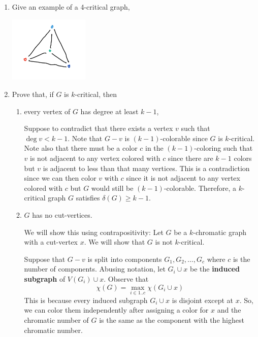 \begin{enumerate}[label=(\roman*)]
    \item Give an example of a 4-critical graph,
      \begin{solution}
        \centering
        \includegraphics[width=0.3\textwidth]{figures/4-critical}
      \end{solution}

    \item Prove that, if \(G\) is \(k\)-critical, then
      \begin{enumerate}[label=(\alph*)]
        \item every vertex of \(G\) has degree at least \(k-1\),
          \begin{solution}
            Suppose to contradict that there exists a vertex
            \(v\) such that \(\deg v < k-1\). Note that \(G-v\)
            is \((k-1)\)-colorable since \(G\) is \(k\)-critical.
            Note also that there must be a color \(c\) in the
            \((k-1)\)-coloring such that \(v\) is not adjacent to
            any vertex colored with \(c\) since there are \(k-1\)
            colors but \(v\) is adjacent to less than that many
            vertices. This is a contradiction since we can then
            color \(v\) with \(c\) since it is not adjacent to
            any vertex colored with \(c\) but \(G\) would still
            be \((k-1)\)-colorable. Therefore, a \(k\)-critical
            graph \(G\) satisfies \(\delta(G) \geq k-1\).
          \end{solution}

        \item \(G\) has no cut-vertices.
          \begin{solution}
            We will show this using contrapositivity: Let \(G\)
            be a \(k\)-chromatic graph with a cut-vertex \(x\).
            We will show that \(G\) is not \(k\)-critical.

            Suppose that \(G-v\) is split into components
            \(G_1, G_2, \ldots, G_c\) where \(c\) is the number
            of components. Abusing notation, let \(G_i \cup
            x\) be the \textbf{induced subgraph} of \(V(G_i)
            \cup x\). Observe that 
            \[
              \chi(G) =
              \max_{i \in 1..c} \chi(G_i \cup x)
            \]
            This is because every induced subgraph \(G_i \cup x\)
            is disjoint except at \(x\). So, we can color them
            independently after assigning a color for \(x\) and
            the chromatic number of \(G\) is the same as the
            component with the highest chromatic number.


\end{solution}
\end{enumerate}
\end{enumerate}
